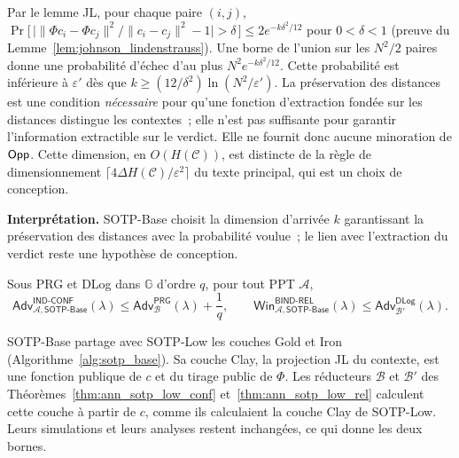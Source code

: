 \begin{sloppypar}
\begin{Preuve}
Par le lemme JL, pour chaque paire $(i,j)$,
$\Pr\bigl[\,\bigl|\|\Phi c_i-\Phi c_j\|^2/\|c_i-c_j\|^2 - 1\bigr| > \delta\,\bigr]
\leq 2e^{-k\delta^2/12}$ pour $0 < \delta < 1$ (preuve du Lemme~\ref{lem:johnson_lindenstrauss}). Une borne de l'union sur les $N^2/2$ paires donne une
probabilit\'e d'\'echec d'au plus $N^2 e^{-k\delta^2/12}$. Cette probabilit\'e est inf\'erieure \`a $\varepsilon'$
d\`es que $k \geq (12/\delta^2)\ln(N^2/\varepsilon')$.
La pr\'eservation des distances est une condition \emph{n\'ecessaire} pour qu'une
fonction d'extraction fond\'ee sur les distances distingue les contextes~; elle
n'est pas suffisante pour garantir l'information extractible sur le verdict.
Elle ne fournit donc aucune minoration de $\mathsf{Opp}$. Cette dimension, en
$O(H(\mathcal{C}))$, est distincte de la r\`egle de dimensionnement
$\lceil 4\Delta H(\mathcal{C})/\varepsilon^2 \rceil$ du texte principal, qui est
un choix de conception.
\end{Preuve}

\noindent\textbf{Interpr\'etation.} SOTP-Base choisit la dimension d'arriv\'ee
$k$ garantissant la pr\'eservation des distances avec la probabilit\'e voulue~;
le lien avec l'extraction du verdict reste une hypoth\`ese de conception.

\begin{corollary}\label{cor:ann_sotp_base_reductions}
Sous PRG et DLog dans $\mathbb{G}$ d'ordre $q$, pour tout PPT $\mathcal{A}$,
\begin{equation}
\mathsf{Adv}^{\mathsf{IND\text{-}CONF}}_{\mathcal{A},\mathsf{SOTP\text{-}Base}}(\lambda)
\leq \mathsf{Adv}^{\mathsf{PRG}}_{\mathcal{B}}(\lambda) + \frac{1}{q},
\qquad
\mathsf{Win}^{\mathsf{BIND\text{-}REL}}_{\mathcal{A},\mathsf{SOTP\text{-}Base}}(\lambda)
\leq \mathsf{Adv}^{\mathsf{DLog}}_{\mathcal{B}'}(\lambda).
\end{equation}
\end{corollary}

\begin{Preuve}
SOTP-Base partage avec SOTP-Low les couches Gold et Iron
(Algorithme~\ref{alg:sotp_base}). Sa couche Clay, la projection JL du contexte, est
une fonction publique de $c$ et du tirage public de $\Phi$. Les r\'educteurs
$\mathcal{B}$ et $\mathcal{B}'$ des Th\'eor\`emes~\ref{thm:ann_sotp_low_conf}
et~\ref{thm:ann_sotp_low_rel} calculent cette couche \`a partir de $c$, comme ils
calculaient la couche Clay de SOTP-Low. Leurs simulations et leurs analyses restent
inchang\'ees, ce qui donne les deux bornes.
\end{Preuve}
\end{sloppypar}

